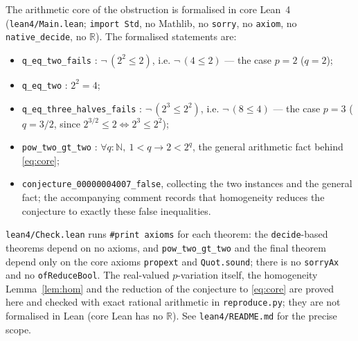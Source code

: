 \documentclass[11pt]{article}
\theoremstyle{definition}
\newcommand{\R}{\mathbb{R}}
\newcommand{\N}{\mathbb{N}}
\begin{document}
The arithmetic core of the obstruction is formalised in core Lean~4
(\texttt{lean4/Main.lean}; \texttt{import Std}, no Mathlib, no \texttt{sorry},
no \texttt{axiom}, no \texttt{native\_decide}, no $\R$).  The formalised
statements are:
\begin{itemize}
  \item \texttt{q\_eq\_two\_fails} : $\lnot\,(2^{2} \le 2)$, i.e. $\lnot\,(4 \le 2)$
        --- the case $p = 2$ ($q = 2$);
  \item \texttt{q\_eq\_two} : $2^{2} = 4$;
  \item \texttt{q\_eq\_three\_halves\_fails} : $\lnot\,(2^{3} \le 2^{2})$,
        i.e. $\lnot\,(8 \le 4)$ --- the case $p = 3$ ($q = 3/2$, since
        $2^{3/2} \le 2 \iff 2^{3} \le 2^{2}$);
  \item \texttt{pow\_two\_gt\_two} : $\forall q : \N,\ 1 < q \to 2 < 2^{q}$,
        the general arithmetic fact behind \eqref{eq:core};
  \item \texttt{conjecture\_00000004007\_false}, collecting the two instances
        and the general fact; the accompanying comment records that
        homogeneity reduces the conjecture to exactly these false
        inequalities.
\end{itemize}
\texttt{lean4/Check.lean} runs \texttt{\#print axioms} for each theorem: the
\texttt{decide}-based theorems depend on no axioms, and
\texttt{pow\_two\_gt\_two} and the final theorem depend only on the core
axioms \texttt{propext} and \texttt{Quot.sound}; there is no \texttt{sorryAx}
and no \texttt{ofReduceBool}.  The real-valued $p$-variation itself, the
homogeneity Lemma~\ref{lem:hom} and the reduction of the conjecture to
\eqref{eq:core} are proved here and checked with exact rational arithmetic in
\texttt{reproduce.py}; they are not formalised in Lean (core Lean has no
$\R$).  See \texttt{lean4/README.md} for the precise scope.
\end{document}
